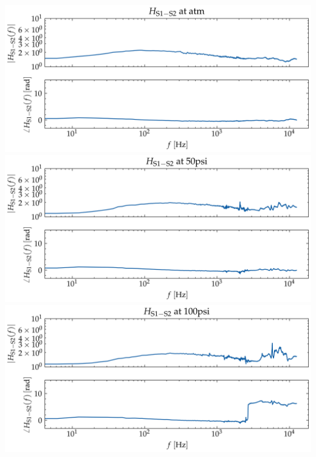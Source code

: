 \documentclass[aspectratio=169,10pt]{beamer}
\begin{document}
\begin{frame}
\begin{columns}[c]
\begin{tikzpicture}[scale=0.7, transform shape,
                node distance=6mm and 18mm, every node/.style={font=\small}]
            \end{tikzpicture}
            \includegraphics[width=0.8\linewidth]{S1-S2/H_atm.png}
            \includegraphics[width=0.8\linewidth]{S1-S2/H_50psi.png}
            \includegraphics[width=0.8\linewidth]{S1-S2/H_100psi.png}
    \end{columns}
\end{frame}
\end{document}
